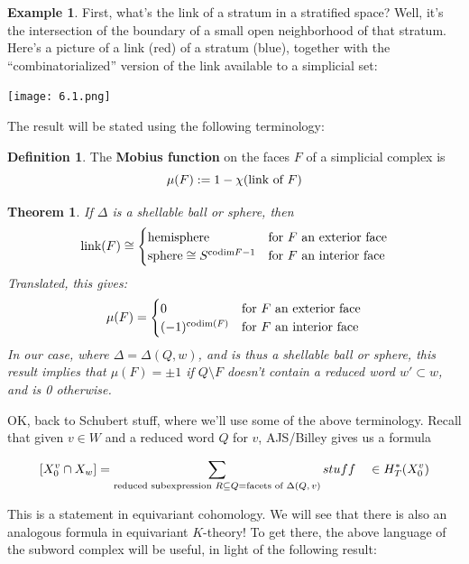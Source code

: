 \documentclass[12pt]{amsart}
\numberwithin{equation}{section}
\newtheorem{Theorem}[equation]{Theorem}
\theoremstyle{definition}
\newtheorem{Example}[equation]{Example}
\newtheorem{Definition}[equation]{Definition}
\numberwithin{figure}{section}
\begin{document}
\begin{Example}
First, what's the link of a stratum in a stratified space?  Well, it's the intersection of the boundary of a small open neighborhood of that stratum.  Here's a picture of a link (red) of a stratum (blue), together with the ``combinatorialized'' version of the link available to a simplicial set:
\begin{center}
\texttt{[image: 6.1.png]}
\end{center}
\end{Example}

The result will be stated using the following terminology:
\begin{Definition}
The \textbf{Mobius function} on the faces $F$ of a simplicial complex is
\[ \mu(F) := 1 - \chi(\textup{link of }F)\]
\end{Definition}

\begin{Theorem}
If $\Delta$ is a shellable ball or sphere, then 
    \[ \textup{link}(F) \cong \begin{cases} \textup{hemisphere} & \textup{for $F$ an exterior face}\\
    \textup{sphere} \cong S^{\textup{codim}{F} - 1} & \textup{for $F$ an interior face}\end{cases}\]
Translated, this gives:
\[\mu(F) = \begin{cases} 0 & \textup{for $F$ an exterior face}\\
   (-1)^{\text{codim}(F)}  & \textup{for $F$ an interior face}\end{cases}\]
In our case, where $\Delta = \Delta(Q,w)$, and is thus a shellable ball or sphere, this result implies that $\mu(F) = \pm1$ if $Q \setminus F$ doesn't contain a reduced word $w' \subset w$, and is 0 otherwise.
\end{Theorem}


OK, back to Schubert stuff, where we'll use some of the above terminology. Recall that given $v\in W$ and a reduced word $Q$ for $v$, AJS/Billey gives us a formula

\[ [ X_0^v \cap X_w] = \sum_{\textup{reduced subexpression }R\subseteq Q\\ = \textup{facets of $\Delta(Q,v)$}} stuff \quad \in H_T^*(X_0^v)\]

This is a statement in equivariant cohomology. We will see that there is also an analogous formula in equivariant $K$-theory!  To get there, the above language of the subword complex will be useful, in light of the following result:
\end{document}

